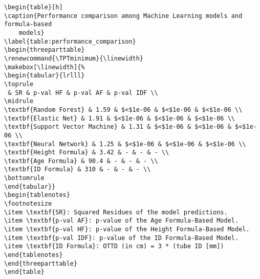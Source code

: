 \documentclass[11pt]{article}
\begin{document}
\begin{Verbatim}[tabsize=4]
\begin{table}[h]
\caption{Performance comparison among Machine Learning models and formula-based
	models}
\label{table:performance_comparison}
\begin{threeparttable}
\renewcommand{\TPTminimum}{\linewidth}
\makebox[\linewidth]{%
\begin{tabular}{lrlll}
\toprule
 & SR & p-val HF & p-val AF & p-val IDF \\
\midrule
\textbf{Random Forest} & 1.59 & $<$1e-06 & $<$1e-06 & $<$1e-06 \\
\textbf{Elastic Net} & 1.91 & $<$1e-06 & $<$1e-06 & $<$1e-06 \\
\textbf{Support Vector Machine} & 1.31 & $<$1e-06 & $<$1e-06 & $<$1e-06 \\
\textbf{Neural Network} & 1.25 & $<$1e-06 & $<$1e-06 & $<$1e-06 \\
\textbf{Height Formula} & 3.42 & - & - & - \\
\textbf{Age Formula} & 90.4 & - & - & - \\
\textbf{ID Formula} & 310 & - & - & - \\
\bottomrule
\end{tabular}}
\begin{tablenotes}
\footnotesize
\item \textbf{SR}: Squared Residues of the model predictions.
\item \textbf{p-val AF}: p-value of the Age Formula-Based Model.
\item \textbf{p-val HF}: p-value of the Height Formula-Based Model.
\item \textbf{p-val IDF}: p-value of the ID Formula-Based Model.
\item \textbf{ID Formula}: OTTD (in cm) = 3 * (tube ID [mm])
\end{tablenotes}
\end{threeparttable}
\end{table}

\end{Verbatim}




\end{document}
